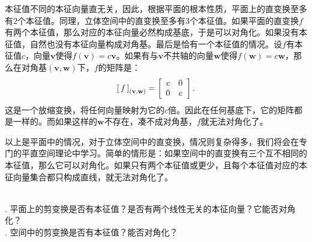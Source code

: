 \documentclass[12pt,UTF8,fontset=none]{ctexbook}
\begin{document}
本征值不同的本征向量直无关，因此，根据平面的根本性质，平面上的直变换至多有$2$个本征值。同理，立体空间中的直变换至多有$3$个本征值。如果平面的直变换$f$有两个本征值，那么对应的本征向量必然构成基底，于是可以对角化。如果没有本征值，自然也没有本征向量构成对角基。最后是恰有一个本征值的情况。设$f$有本征值$c$，向量$\mathbf{v}$使得$f(\mathbf{v}) = c\mathbf{v}$。如果有与$\mathbf{v}$不共轴的向量$\mathbf{w}$使得$f(\mathbf{w}) = c\mathbf{w}$，那么在对角基$(\mathbf{v},\mathbf{w})$下，$f$的矩阵是：
$$
\bmat{f}[(\mathbf{v},\mathbf{w})] = \begin{bmatrix}
    \phantom{0}c&0\phantom{0}\\\phantom{0}0&c\phantom{0}
\end{bmatrix}.
$$
这是一个放缩变换，将任何向量映射为它的$c$倍。因此在任何基底下，它的矩阵都是一样的。而如果这样的$\mathbf{w}$不存在，凑不成对角基，$f$就无法对角化了。

以上是平面中的情况，对于立体空间中的直变换，情况则复杂得多，我们将会在专门的平直空间理论中学习。简单的情形是：如果空间中的直变换有三个互不相同的本征值，那么它可以对角化。如果只有两个本征值或更少，且每个本征值对应的本征向量集合都只构成直线，就无法对角化了。

\begin{sk}
    \mbox{} \\
    . 平面上的剪变换是否有本征值？是否有两个线性无关的本征向量？它能否对角化？\\
    . 空间中的剪变换是否有本征值？能否对角化？
\end{sk}
\end{document}
